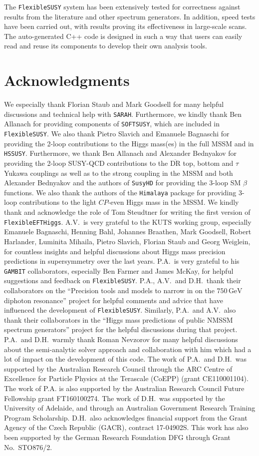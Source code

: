 \documentclass[final,3p,11pt,pdflatex]{elsarticle}
\makeatletter
\newcommand{\modelname}[1]{\texttt{#1}\@\xspace}
\newcommand{\sarah}{\texttt{SARAH}\@\xspace}
\newcommand{\fs}{\texttt{FlexibleSUSY}\@\xspace}
\newcommand{\HSSUSY}{\modelname{HSSUSY}}
\newcommand{\susyhd}{\texttt{SusyHD}\@\xspace}
\newcommand{\softsusy}{\texttt{SOFTSUSY}\@\xspace}
\newcommand{\Himalaya}{\texttt{Himalaya}\@\xspace}
\newcommand{\GAMBIT}{\texttt{GAMBIT}\@\xspace}
\newcommand{\feft}{\texttt{Flex\-ib\-le\-EFT\-Higgs}\@\xspace}
\newcommand{\ol}[1]{\overline{#1}}
\newcommand{\DRbar}{\ensuremath{\ol{\text{DR}}}\xspace}
\newcommand{\unit}[1]{\,\text{#1}}      %
\newcommand{\CP}{\ensuremath{CP}\xspace}
\newcommand{\SQCD}{SUSY-QCD\xspace}
\makeatother
\begin{document}
The \fs system has been extensively tested for correctness against
results from the literature and other spectrum generators.  In
addition, speed tests have been carried out, with results proving its
effectiveness in large-scale scans.  The auto-generated C++ code is
designed in such a way that users can easily read and reuse
its components to develop their own analysis tools.

\section*{Acknowledgments}

We especially thank Florian Staub and Mark Goodsell for many helpful
discussions and technical help with \sarah.  Furthermore, we kindly
thank Ben Allanach for providing components of \softsusy, which are
included in \fs.  We also thank Pietro Slavich and Emanuele Bagnaschi
for providing the 2-loop contributions to the Higgs mass(es) in the
full MSSM and in \HSSUSY.
%
Furthermore, we thank Ben
Allanach and Alexander Bednyakov for providing the 2-loop \SQCD
contributions to the \DRbar top, bottom and $\tau$ Yukawa couplings as
well as to the strong coupling in the MSSM and both Alexander
Bednyakov and the authors of \susyhd for providing the 3-loop SM $\beta$
functions.  We also thank the authors of the \Himalaya
package for providing 3-loop contributions to the light \CP-even Higgs mass
in the MSSM\@.
%
We kindly thank and acknowledge the role of Tom Steudtner for writing
the first version of \feft.
%
A.V.\ is very grateful to the KUTS working group, especially Emanuele
Bagnaschi, Henning Bahl, Johannes Braathen, Mark Goodsell, Robert
Harlander, Luminita Mihaila, Pietro Slavich, Florian Staub and Georg
Weiglein, for countless insights and helpful discussions about Higgs
mass precision predictions in supersymmetry over the last years.
%
P.A.\ is very grateful to his \GAMBIT collaborators, especially Ben
Farmer and James McKay, for helpful suggestions and feedback on
\fs. P.A., A.V.\ and D.H.\ thank their collaborators on the
``Precision tools and models to narrow in on the $750\unit{GeV}$
diphoton resonance'' project for helpful comments and advice that have
influenced the development of \fs.  Similarly, P.A.\ and A.V.\ also
thank their collaborators in the ``Higgs mass predictions of public
NMSSM spectrum generators'' project for the helpful discussions during
that project.  P.A.\ and D.H.\ warmly thank Roman Nevzorov for many
helpful discussions about the semi-analytic solver approach and
collaboration with him which had a lot of impact on the development of
this code.  The work of P.A.\ and D.H.\ was supported by the Australian
Research Council through the ARC Centre of Excellence for Particle Physics
at the Terascale (CoEPP) (grant CE110001104).  The work of P.A. is also
supported by the Australian Research Council Future Fellowship grant
FT160100274.  The work of D.H.\ was supported by the University of Adelaide,
and through an Australian Government Research Training Program Scholarship.
D.H.\ also acknowledges financial support from the Grant Agency of the Czech
Republic (GACR), contract 17-04902S\@.  This work has also been supported by the
German Research Foundation DFG through Grant No.~STO876/2.
\end{document}
